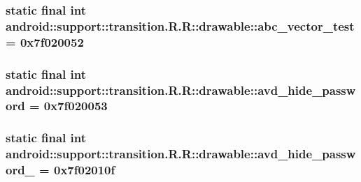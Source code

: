 \hypertarget{classandroid_1_1support_1_1transition_1_1_r_1_1drawable_340adec4d07e056c8481609cc53f9b83}{
\subsubsection[{abc\_\-vector\_\-test}]{\setlength{\rightskip}{0pt plus 5cm}static final int android::support::transition.R.R::drawable::abc\_\-vector\_\-test = 0x7f020052}}
\label{classandroid_1_1support_1_1transition_1_1_r_1_1drawable_340adec4d07e056c8481609cc53f9b83}


\hypertarget{classandroid_1_1support_1_1transition_1_1_r_1_1drawable_7d3a353dcd29f145af7c204262b76de1}{
\subsubsection[{avd\_\-hide\_\-password}]{\setlength{\rightskip}{0pt plus 5cm}static final int android::support::transition.R.R::drawable::avd\_\-hide\_\-password = 0x7f020053}}
\label{classandroid_1_1support_1_1transition_1_1_r_1_1drawable_7d3a353dcd29f145af7c204262b76de1}


\hypertarget{classandroid_1_1support_1_1transition_1_1_r_1_1drawable_2dca73b1d6761bd14bdbcdb008217a34}{
\subsubsection[{avd\_\-hide\_\-password\_\-1}]{\setlength{\rightskip}{0pt plus 5cm}static final int android::support::transition.R.R::drawable::avd\_\-hide\_\-password\_ = 0x7f02010f}}
\label{classandroid_1_1support_1_1transition_1_1_r_1_1drawable_2dca73b1d6761bd14bdbcdb008217a34}



